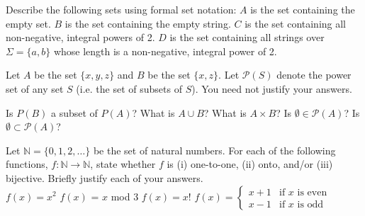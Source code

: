 \documentclass[solution]{cs121}
\begin{document}


\problem{}
Describe the following sets using formal set notation:
\subproblem $A$  is the set containing the empty set.
\subproblem $B$  is the set containing the empty string.
\subproblem $C$  is the set containing all non-negative, integral powers of 2.
\subproblem $D$  is the set containing all strings over $\Sigma=\{a,b\}$ whose length is a non-negative, integral power of 2.

\solution
\subproblem %
\subproblem %
\subproblem %
\subproblem %



\problem{}
Let $A$ be the set $\{ x,y,z \}$ and $B$ be the set $\{ x, z \}$.  Let
$\mathcal{P}(S)$ denote the power set of any set $S$ (i.e. the set of subsets of $S$). You need not justify your answers.

\subproblem Is $P(B)$ a subset of $P(A)$?
\subproblem What is $A \cup B$?
\subproblem What is $A \times B$?
\subproblem Is $\emptyset \in \mathcal{P}(A)$?
\subproblem Is $\emptyset \subset \mathcal{P}(A)$?

\solution
\subproblem %
\subproblem %
\subproblem %
\subproblem %



\problem{}
 Let $\mathbb{N} = \{0, 1,2,\ldots\}$ be the set of natural numbers. For each of the following functions, $f: \mathbb{N}
\longrightarrow \mathbb{N}$, state whether $f$ is (i) one-to-one,
(ii) onto, and/or (iii) bijective. Briefly justify each of your answers.\\
\subproblem $f(x) = x^2$
\subproblem $f(x)$ =  $x$ mod 3
\subproblem $f(x) = x!$
\subproblem $f(x) = \begin{cases} x+1 & \text{if $x$ is even} \\
x-1 & \text{if $x$ is odd}\end{cases}$

\solution
\subproblem %
\subproblem %
\subproblem %
\subproblem %


\end{document}
